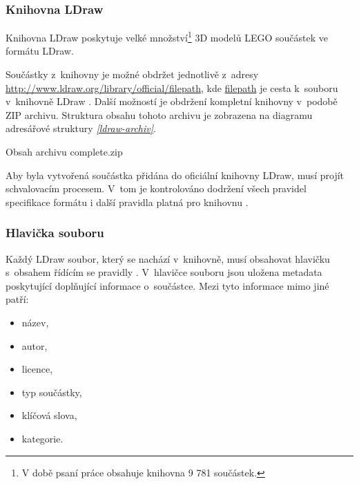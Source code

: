     \subsubsection*{Knihovna LDraw}\label{ldraw-knihovna}
    Knihovna LDraw poskytuje velké množství\footnote{V době psaní práce obsahuje knihovna 9 781 součástek.} 3D modelů LEGO součástek ve formátu LDraw.

    \sloppy
    Součástky z~knihovny je možné obdržet jednotlivě z~adresy \url{http://www.ldraw.org/library/official/filepath}, kde \url{filepath} je cesta k~souboru v~knihovně LDraw \autocite{ldraw:download}. Další možností je obdržení kompletní knihovny v~podobě ZIP archivu. Struktura obsahu tohoto archivu je zobrazena na diagramu adresářové struktury \emph{\ref{ldraw-archiv}}.

    \begin{dirfigure}%
        \caption{Obsah archivu complete.zip}\label{ldraw-archiv}
    \end{dirfigure}

    Aby byla vytvořená součástka přidána do oficiální knihovny LDraw, musí projít schvalovacím procesem. V~tom je kontrolováno dodržení všech pravidel specifikace formátu \autocite{ldraw:file:specification} i další pravidla platná pro knihovnu \cite{ldraw:library:restrictions}.

    \subsubsection*{Hlavička souboru}\label{ldraw-hlavicka}
        Každý LDraw soubor, který se nachází v~knihovně, musí obsahovat hlavičku s~obsahem řídícím se pravidly \autocite{ldraw:header:specification}. V~hlavičce souboru jsou uložena metadata poskytující doplňující informace o~součástce. Mezi tyto informace mimo jiné patří:
        \begin{itemize}
            \item název,
            \item autor,
            \item licence,
            \item typ součástky,
            \item klíčová slova,
            \item kategorie.
        \end{itemize}
 
